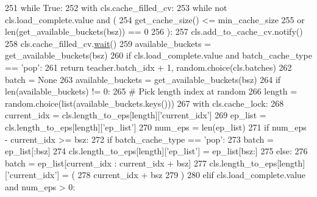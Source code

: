 \begin{DoxyCode}
251                 \textcolor{keywordflow}{while} \textcolor{keyword}{True}:
252                     with cls.cache\_filled\_cv:
253                         \textcolor{keywordflow}{while} \textcolor{keywordflow}{not} cls.load\_complete.value \textcolor{keywordflow}{and} (
254                             get\_cache\_size() <= min\_cache\_size
255                             \textcolor{keywordflow}{or} len(get\_available\_buckets(bsz)) == 0
256                         ):
257                             cls.add\_to\_cache\_cv.notify()
258                             cls.cache\_filled\_cv.\hyperlink{namespaceparlai_1_1mturk_1_1scripts_1_1auto__complete__hit_a41016a44ce805b615732efe5c479551c}{wait}()
259                             available\_buckets = get\_available\_buckets(bsz)
260                     \textcolor{keywordflow}{if} cls.load\_complete.value \textcolor{keywordflow}{and} batch\_cache\_type == \textcolor{stringliteral}{'pop'}:
261                         \textcolor{keywordflow}{return} teacher.batch\_idx + 1, random.choice(cls.batches)
262                     batch = \textcolor{keywordtype}{None}
263                     available\_buckets = get\_available\_buckets(bsz)
264                     \textcolor{keywordflow}{if} len(available\_buckets) != 0:
265                         \textcolor{comment}{# Pick length index at random}
266                         length = random.choice(list(available\_buckets.keys()))
267                         with cls.cache\_lock:
268                             current\_idx = cls.length\_to\_eps[length][\textcolor{stringliteral}{'current\_idx'}]
269                             ep\_list = cls.length\_to\_eps[length][\textcolor{stringliteral}{'ep\_list'}]
270                             num\_eps = len(ep\_list)
271                             \textcolor{keywordflow}{if} num\_eps - current\_idx >= bsz:
272                                 \textcolor{keywordflow}{if} batch\_cache\_type == \textcolor{stringliteral}{'pop'}:
273                                     batch = ep\_list[:bsz]
274                                     cls.length\_to\_eps[length][\textcolor{stringliteral}{'ep\_list'}] = ep\_list[bsz:]
275                                 \textcolor{keywordflow}{else}:
276                                     batch = ep\_list[current\_idx : current\_idx + bsz]
277                                     cls.length\_to\_eps[length][\textcolor{stringliteral}{'current\_idx'}] = (
278                                         current\_idx + bsz
279                                     )
280                             \textcolor{keywordflow}{elif} cls.load\_complete.value \textcolor{keywordflow}{and} num\_eps > 0:

\end{DoxyCode}
